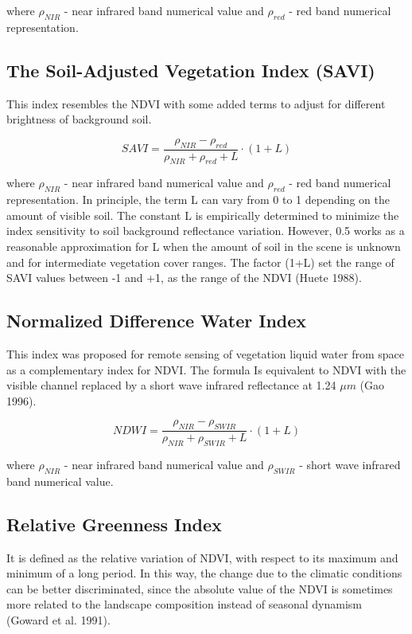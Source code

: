 {{	where $\rho_{NIR}$ - near infrared band numerical value and $\rho_{red}$ - red band numerical representation.
	
\subsection{The Soil-Adjusted Vegetation Index (SAVI)}
	This index resembles the NDVI with some added terms to adjust for different brightness of background soil. 
	
	\begin{equation}
	SAVI = \dfrac{\rho_{NIR} - \rho_{red}}{\rho_{NIR} + \rho_{red} + L} \cdot (1 + L)
	\end{equation}
	
	where $\rho_{NIR}$ - near infrared band numerical value and $\rho_{red}$ - red band numerical representation. In principle, the term L can vary from 0 to 1 depending on the amount of visible soil. The constant L is empirically determined to minimize the index sensitivity to soil background reflectance
	variation. However, 0.5 works as a reasonable approximation for L when the amount of soil in the
	scene is unknown and for intermediate vegetation cover ranges. The factor (1+L) set the range of
	SAVI values between -1 and +1, as the range of the NDVI (Huete 1988).

\subsection{Normalized Difference Water Index}
	This index was proposed for remote sensing of vegetation liquid water from space as a complementary
	index for NDVI. The formula Is equivalent to NDVI with the visible channel replaced by a short wave
	infrared reflectance at 1.24 $\mu m$ (Gao 1996).
	
	\begin{equation}
	NDWI = \dfrac{\rho_{NIR} - \rho_{SWIR}}{\rho_{NIR} + \rho_{SWIR} + L} \cdot (1 + L)
	\end{equation}
	
	where $\rho_{NIR}$ - near infrared band numerical value and $\rho_{SWIR}$ - short wave infrared band numerical value.
	
\subsection{Relative Greenness Index}
	It is defined as the relative variation of NDVI, with respect to its maximum and minimum of a long
	period. In this way, the change due to the climatic conditions can be better discriminated, since the absolute value of the NDVI is sometimes more related to the landscape composition instead of seasonal
	dynamism (Goward et al. 1991).
	
}}
